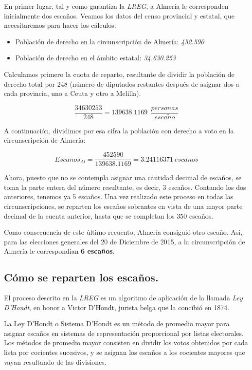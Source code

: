 \documentclass[11pt]{article}
\begin{document}
	En primer lugar, tal y como garantiza la \textit{LREG}, a Almería le corresponden inicialmente dos escaños. Veamos los datos del censo provincial y estatal, que necesitaremos para hacer los cálculos:
	
	\begin{itemize}
	\item Población de derecho en la circunscripción de Almería: \textit{452.590}
	\item Población de derecho en el ámbito estatal: \textit{34.630.253}
	\end{itemize}
	
	Calculamos primero la cuota de reparto, resultante de dividir la población de derecho total por 248 (número de diputados restantes después de asignar dos a cada provincia, uno a Ceuta y otro a Melilla).

	$$\dfrac{34630253}{248} = 139638.1169\ \ \frac{personas}{esca\tilde{n}o}$$
	
	A continuación, dividimos por esa cifra la población con derecho a voto en la circunscripción de Almería:
	
	$$Esca\tilde{n}os_{Al} = \dfrac{452590}{139638.1169} = 3.24116371\ esca\tilde{n}os$$

  Ahora, puesto que no se contempla asignar una cantidad decimal de escaños, se toma la parte entera del número resultante, es decir, 3 escaños. Contando los dos anteriores, tenemos ya 5 escaños. Una vez realizado este proceso en todas las circunscripciones, se reparten los escaños sobrantes en vista de una mayor parte decimal de la cuenta anterior, hasta que se completan los 350 escaños.
  
  Como consecuencia de este último recuento, Almería consiguió otro escaño. Así, para las elecciones generales del 20 de Diciembre de 2015, a la circunscripción de Almería le correspondían \textbf{6 escaños}.
  
	\subsection{Cómo se reparten los escaños.}
	
	El proceso descrito en la \textit{LREG} es un algoritmo de aplicación de la llamada \textit{Ley D'Hondt}, en honor a Victor D'Hondt, jurista belga que la concibió en 1874.
	
	La Ley D'Hondt o Sistema D'Hondt es un método de promedio mayor para asignar escaños en sistemas de representación proporcional por listas electorales. Los métodos de promedio mayor consisten en dividir los votos obtenidos por cada lista por cocientes sucesivos, y se asignan los escaños a los cocientes mayores que vayan resultando de las divisiones.
	
\end{document}
